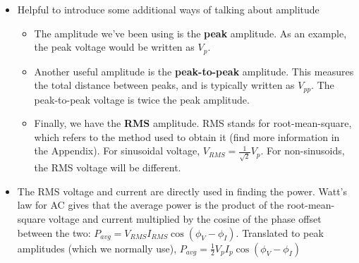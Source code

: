 \begin{itemize}
\item Helpful to introduce some additional ways of talking about amplitude
  \begin{itemize}
  \item The amplitude we've been using is the {\bf peak} amplitude.  As an example, the peak voltage would be written as $V_p$.
  \item Another useful amplitude is the {\bf peak-to-peak} amplitude.  This measures the total distance between peaks, and is typically written as $V_{pp}$.  The peak-to-peak voltage is twice the peak amplitude.
  \item Finally, we have the {\bf RMS} amplitude.  RMS stands for root-mean-square, which refers to the method used to obtain it (find more information in the Appendix). For sinusoidal voltage, $V_{RMS}=\frac{1}{\sqrt{2}}V_p$.  For non-sinusoids, the RMS voltage will be different.
  \end{itemize}
\item The RMS voltage and current are directly used in finding the power.  Watt's law for AC gives that the average power is the product of the root-mean-square voltage and current multiplied by the cosine of the phase offset between the two: $P_{avg}=V_{RMS}I_{RMS}\cos(\phi_V-\phi_I)$.  Translated to peak amplitudes (which we normally use), $P_{avg}=\frac{1}{2}V_pI_p\cos(\phi_V-\phi_I)$
\end{itemize}
